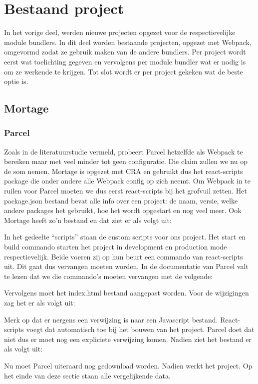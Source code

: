 \section{Bestaand project}
In het vorige deel, werden nieuwe projecten opgezet voor de respectievelijke module bundlers. In dit deel worden bestaande projecten, opgezet met Webpack, omgevormd zodat ze gebruik maken van de andere bundlers. Per project wordt eerst wat toelichting gegeven en vervolgens per module bundler wat er nodig is om ze werkende te krijgen. Tot slot wordt er per project gekeken wat de beste optie is. 

\subsection{Mortage}

\subsubsection{Parcel}
Zoals in de literatuurstudie vermeld, probeert Parcel hetzelfde als Webpack te bereiken maar met veel minder tot geen configuratie. Die claim zullen we nu op de som nemen. Mortage is opgezet met CRA en gebruikt dus het react-scripts package die onder andere alle Webpack config op zich neemt. Om Webpack in te ruilen voor Parcel moeten we dus eerst react-scripts bij het grofvuil zetten. Het package.json bestand bevat alle info over een project: de naam, versie, welke andere packages het gebruikt, hoe het wordt opgestart en nog veel meer. Ook Mortage heeft zo’n bestand en dat ziet er als volgt uit:


In het gedeelte “scripts” staan de custom scripts voor ons project. Het start en build commando starten het project in development en production mode respectievelijk. Beide voeren zij op hun beurt een commando van react-scripts uit. Dit gaat dus vervangen moeten worden. In de documentatie van Parcel valt te lezen dat we die commando’s moeten vervangen met de volgende:

Vervolgens moet het index.html bestand aangepast worden. Voor de wijzigingen zag het er als volgt uit:

Merk op dat er nergens een verwijzing is naar een Javascript bestand. React-scripts voegt dat automatisch toe bij het bouwen van het project. Parcel doet dat niet dus er moet nog een expliciete verwijzing komen. Nadien ziet het bestand er als volgt uit:

Nu moet Parcel uiteraard nog gedownload worden. Nadien werkt het project. Op het einde van deze sectie staan alle vergelijkende data.

